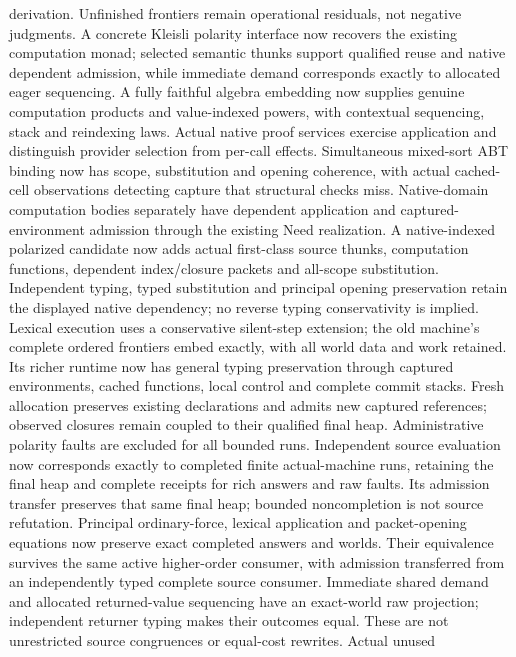 \documentclass[11pt]{article}
\theoremstyle{definition}
\theoremstyle{remark}
\begin{document}
\begin{enumerate}
  derivation. Unfinished frontiers remain operational residuals, not negative
  judgments. A concrete Kleisli polarity interface now recovers the existing
  computation monad; selected semantic thunks support qualified reuse and
  native dependent admission, while immediate demand corresponds exactly
  to allocated eager sequencing. A fully faithful algebra embedding now
  supplies genuine computation products and value-indexed powers, with
  contextual sequencing, stack and reindexing laws. Actual native proof
  services exercise application and distinguish provider selection from
  per-call effects. Simultaneous mixed-sort ABT binding now has scope,
  substitution and opening coherence, with actual cached-cell observations
  detecting capture that structural checks miss. Native-domain computation
  bodies separately have dependent application and captured-environment
  admission through the existing Need realization. A native-indexed polarized
  candidate now adds actual first-class source thunks, computation functions,
  dependent index/closure packets and all-scope substitution. Independent
  typing, typed substitution and principal opening preservation retain the
  displayed native dependency; no reverse typing conservativity is implied.
  Lexical execution
  uses a conservative silent-step extension; the old machine's complete
  ordered frontiers embed exactly, with all world data and work retained.
  Its richer runtime now has general typing preservation through captured
  environments, cached functions, local control and complete commit stacks.
  Fresh allocation preserves existing declarations and admits new captured
  references; observed closures remain coupled to their qualified final heap.
  Administrative polarity faults are excluded for all bounded runs.
  Independent source evaluation now corresponds exactly to completed finite
  actual-machine runs, retaining the final heap and complete receipts for
  rich answers and raw faults. Its admission transfer preserves that same
  final heap; bounded noncompletion is not source refutation.
  Principal ordinary-force, lexical application and packet-opening equations
  now preserve exact completed answers and worlds. Their equivalence survives
  the same active higher-order consumer, with admission transferred from an
  independently typed complete source consumer. Immediate shared demand and
  allocated returned-value sequencing have an exact-world raw projection;
  independent returner typing makes their outcomes equal. These are not
  unrestricted source congruences or equal-cost rewrites. Actual unused

\end{enumerate}
\end{document}
